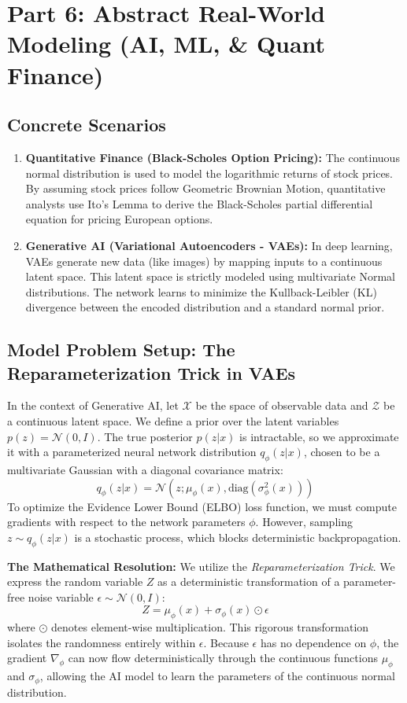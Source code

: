 \documentclass[11pt, a4paper]{article}
\theoremstyle{definition}
\theoremstyle{remark}
\begin{document}
\section{Part 6: Abstract Real-World Modeling (AI, ML, \& Quant Finance)}

\subsection{Concrete Scenarios}
\begin{enumerate}
    \item \textbf{Quantitative Finance (Black-Scholes Option Pricing):} The continuous normal distribution is used to model the logarithmic returns of stock prices. By assuming stock prices follow Geometric Brownian Motion, quantitative analysts use Ito's Lemma to derive the Black-Scholes partial differential equation for pricing European options.
    \item \textbf{Generative AI (Variational Autoencoders - VAEs):} In deep learning, VAEs generate new data (like images) by mapping inputs to a continuous latent space. This latent space is strictly modeled using multivariate Normal distributions. The network learns to minimize the Kullback-Leibler (KL) divergence between the encoded distribution and a standard normal prior.
\end{enumerate}

\subsection{Model Problem Setup: The Reparameterization Trick in VAEs}
In the context of Generative AI, let $\mathcal{X}$ be the space of observable data and $\mathcal{Z}$ be a continuous latent space. We define a prior over the latent variables $p(z) = \mathcal{N}(0, I)$. The true posterior $p(z|x)$ is intractable, so we approximate it with a parameterized neural network distribution $q_\phi(z|x)$, chosen to be a multivariate Gaussian with a diagonal covariance matrix:
\[ q_\phi(z|x) = \mathcal{N}(z; \mu_\phi(x), \text{diag}(\sigma_\phi^2(x))) \]
To optimize the Evidence Lower Bound (ELBO) loss function, we must compute gradients with respect to the network parameters $\phi$. However, sampling $z \sim q_\phi(z|x)$ is a stochastic process, which blocks deterministic backpropagation.

\textbf{The Mathematical Resolution:} We utilize the \textit{Reparameterization Trick}. We express the random variable $Z$ as a deterministic transformation of a parameter-free noise variable $\epsilon \sim \mathcal{N}(0, I)$:
\[ Z = \mu_\phi(x) + \sigma_\phi(x) \odot \epsilon \]
where $\odot$ denotes element-wise multiplication. This rigorous transformation isolates the randomness entirely within $\epsilon$. Because $\epsilon$ has no dependence on $\phi$, the gradient $\nabla_\phi$ can now flow deterministically through the continuous functions $\mu_\phi$ and $\sigma_\phi$, allowing the AI model to learn the parameters of the continuous normal distribution.
\end{document}
